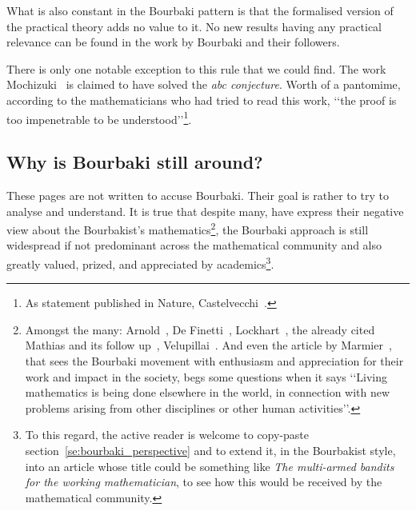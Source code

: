 \documentclass[]{scrartcl}
\theoremstyle{definition}
\begin{document}
What is also constant in the Bourbaki pattern is that the formalised version of the practical theory adds no value to it. No new results having any practical relevance can be found in the work by Bourbaki and their followers.

There is only one notable exception to this rule that we could find. The work Mochizuki~\cite{mochizuki2012inter} is claimed to have solved the \emph{abc conjecture}. Worth of a pantomime, according to the mathematicians who had tried to read this work, \lq\lq the proof is too impenetrable to be understood\rq\rq\footnote{As statement published in Nature, Castelvecchi~\cite{castelvecchi2015biggest}.}.

\subsection*{Why is Bourbaki still around?}






These pages are not written to accuse Bourbaki. Their goal is rather to try to analyse and understand.
It is true that despite many, have express their negative view about the Bourbakist's mathematics\footnote{
    Amongst the many: Arnold~\cite{arnol1998teaching}, De Finetti~\cite{de2008bruno}, Lockhart~\cite{lockhart2009mathematician}, the already cited Mathias and its follow up~\cite{mathias1998further}, Velupillai~\cite{velupillai2012bourbaki}. And even the article by Marmier~\cite{marmier2014idea}, that sees the Bourbaki movement with enthusiasm and appreciation for their work and impact in the society, begs some questions when it says
    \lq\lq Living mathematics is being done elsewhere in the world, in connection with new problems arising from other disciplines or other human activities\rq\rq.
}, the Bourbaki approach is still widespread if not predominant across the mathematical community and also greatly valued, prized, and appreciated by academics\footnote{
    To this regard, the active reader is welcome to copy-paste section~\ref{se:bourbaki_perspective} and to extend it, in the Bourbakist style, into an article whose title could be something like \emph{The multi-armed bandits for the working mathematician}, to see how this would be received by the mathematical community.
}.
\end{document}
